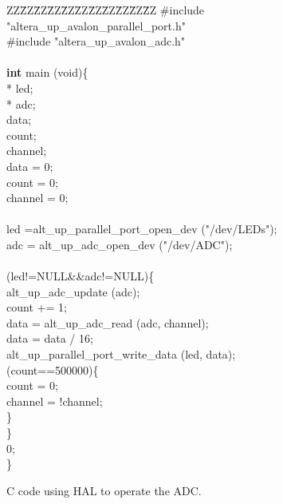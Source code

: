 \begin{figure}[h]

\begin{center} %
\parbox{12.5cm}{
\begin{tabbing}
ZZ\=ZZ\=ZZ\=ZZ\=ZZ\=ZZ\=ZZ\=ZZ\=ZZ\=ZZ\=ZZ\kill
\#include "altera\_up\_avalon\_parallel\_port.h"\\
\#include "altera\_up\_avalon\_adc.h"\\
\\
{\bf int} main (void)\{\\
 * led;\\
 * adc;\\
 data;\\
 count;\\
 channel;\\
\>data = 0;\\
\>count = 0;\\
\>channel = 0;\\
\\
\>led =alt\_up\_parallel\_port\_open\_dev ("/dev/LEDs");\\
\>adc = alt\_up\_adc\_open\_dev ("/dev/ADC");\\
\\
 (led!=NULL\&\&adc!=NULL)\{\\
\>\>alt\_up\_adc\_update (adc);\\
\>\>count += 1;\\
\>\>data = alt\_up\_adc\_read (adc, channel);\\
\>\>data = data / 16;\\
\>\>alt\_up\_parallel\_port\_write\_data (led, data);\\
\> (count==500000)\{\\
\>\>\>count = 0;\\
\>\>\>channel = !channel;\\
\>\>\}\\
\>\}\\
 0;\\
\}\\
\end{tabbing} } %
	\caption{C code using HAL to operate the ADC.}
	\label{fig:hal_code}
\end{center}
\end{figure}